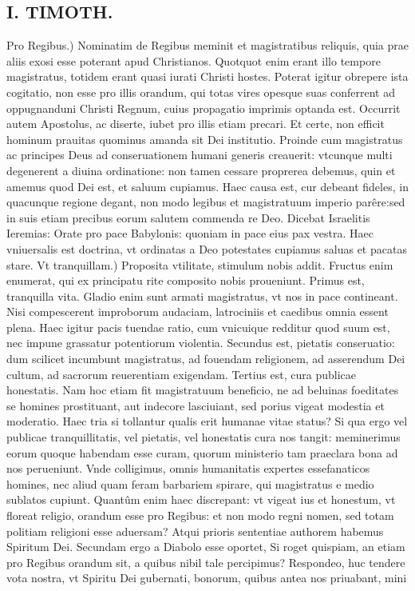 \documentclass{article}
\begin{document}
\begin{pages}
\section*{I. TIMOTH. }
\marginpar{[ p.18 ]}\pstart Pro Regibus.) Nominatim de Regibus meminit et magistratibus reliquis, quia prae aliis exosi esse poterant apud Christianos. Quotquot enim erant illo tempore magistratus, totidem erant quasi iurati Christi hostes. Poterat igitur obrepere ista cogitatio, non esse pro illis orandum, qui totas vires opesque suas conferrent ad oppugnanduni Christi Regnum, cuius propagatio imprimis optanda est. Occurrit autem Apostolus, ac diserte, iubet pro illis etiam precari. Et certe, non efficit hominum prauitas quominus amanda sit Dei institutio. Proinde cum magistratus ac principes Deus ad conseruationem humani generis creauerit: vtcunque multi degenerent a diuina ordinatione: non tamen cessare proprerea debemus, quin et amemus quod Dei est, et saluum cupiamus. Haec causa est, cur debeant fideles, in quacunque regione degant, non modo legibus et magistratuum imperio parêre:sed in suis etiam precibus eorum salutem commenda re Deo. Dicebat Israelitis Ieremias: Orate pro pace Babylonis: quoniam in pace eius pax vestra. Haec vniuersalis est doctrina, vt ordinatas a Deo potestates cupiamus saluas et pacatas stare.  \pend\pstart Vt tranquillam.) Proposita vtilitate, stimulum nobis addit. Fructus enim enumerat, qui ex principatu rite composito nobis proueniunt. Primus est, tranquilla vita. Gladio enim sunt armati magistratus, vt nos in pace contineant. Nisi compescerent improborum audaciam, latrociniis et caedibus omnia essent plena. Haec igitur pacis tuendae ratio, cum vnicuique redditur quod suum est, nec impune grassatur potentiorum violentia. Secundus est, pietatis conseruatio: dum scilicet incumbunt magistratus, ad fouendam religionem, ad asserendum Dei cultum, ad sacrorum reuerentiam exigendam. Tertius est, cura publicae honestatis. Nam hoc etiam fit magistratuum beneficio, ne ad beluinas foeditates se homines prostituant, aut indecore lasciuiant, sed porius vigeat modestia et moderatio. Haec tria si tollantur qualis erit humanae vitae status? Si qua ergo vel publicae tranquillitatis, vel pietatis, vel honestatis cura nos tangit: meminerimus eorum quoque habendam esse curam, quorum ministerio tam praeclara bona ad nos perueniunt. Vnde colligimus, omnis humanitatis expertes essefanaticos homines, nec aliud quam feram barbariem spirare, qui magistratus e medio sublatos cupiunt. Quantûm enim haec discrepant: vt vigeat ius et honestum, vt floreat religio, orandum esse pro Regibus: et non modo regni nomen, sed totam politiam religioni esse aduersam? Atqui prioris sententiae authorem habemus Spiritum Dei. Secundam ergo a Diabolo esse oportet, Si roget quispiam, an etiam pro Regibus orandum sit, a quibus nibil tale percipimus? Respondeo, huc tendere vota nostra, vt Spiritu Dei gubernati, bonorum, quibus antea nos priuabant, mini\pend

\end{pages}
\end{document}
